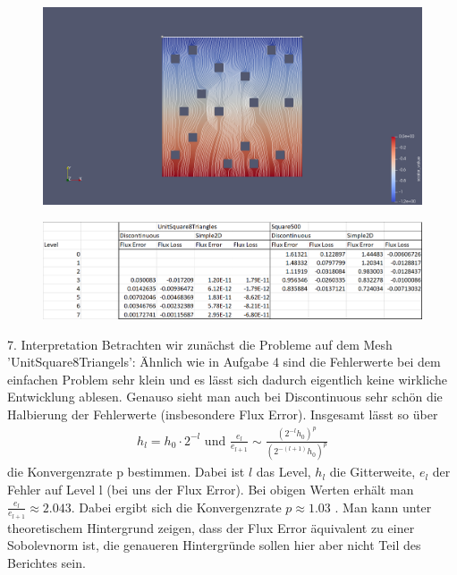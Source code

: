 \documentclass[12pt,a4paper]{scrartcl}
\numberwithin{equation}{section}
\begin{document}
\begin{enumerate}[label=(\roman*)]
\begin{figure}[H]
	\centering
\includegraphics[width=\textwidth]{../Problem_DiscontinousMesh_Square500level_4/blub.png} 
\end{figure}



\begin{figure}[H]
	\centering
\includegraphics[width=\textwidth]{../Aufgabe6/Aufgabe6Tabelle.png}
\end{figure}

7. Interpretation \newline
Betrachten wir zunächst die Probleme auf dem Mesh 'UnitSquare8Triangels': \newline
Ähnlich wie in Aufgabe 4 sind die Fehlerwerte bei dem einfachen Problem sehr klein und es lässt sich dadurch eigentlich keine wirkliche Entwicklung ablesen. Genauso sieht man auch bei Discontinuous sehr schön die Halbierung der Fehlerwerte (insbesondere Flux Error). Insgesamt lässt so über 
\begin{align*}
h_l = h_0 \cdot 2^{-l} \text{ und } \frac{e_l}{e_{l+1}} \sim \frac{(2^{-l}h_0)^{p}}{(2^{-(l+1)}h_0)^{p}} %
\end{align*}
die Konvergenzrate p bestimmen. Dabei ist $l$ das Level, $h_l$ die Gitterweite, $e_l$ der Fehler auf Level l (bei uns der Flux Error). 
Bei obigen Werten erhält man $ \frac{e_l}{e_{l+1}} \approx 2.043 $. \newline
Dabei ergibt sich die Konvergenzrate $p \approx 1.03$ .
Man kann unter theoretischem Hintergrund zeigen, dass der Flux Error äquivalent zu einer Sobolevnorm ist, die genaueren Hintergründe sollen hier aber nicht Teil des Berichtes sein.


\end{enumerate}
\end{document}
